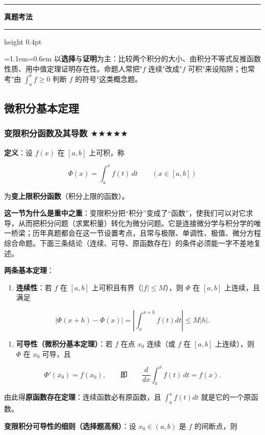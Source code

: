 \documentclass[11pt,openany,UTF8]{ctexbook}
\newcommand{\callouthead}[2]{%
  \par\addvspace{7pt}\noindent
  {\color{#1}\rule[-0.15em]{3pt}{1.05em}}\hspace{0.5em}%
  {\bfseries\color{#1}#2}\par\nobreak\vspace{-0.35em}%
  {\color{rulesep}\hrule height 0.4pt}\nobreak\vspace{0.45em}%
  \begingroup\small\setlength{\parindent}{0pt}%
  \leftskip=1.1em\rightskip=0.6em\noindent\ignorespaces}
\newcommand{\calloutend}{\par\endgroup\addvspace{7pt}}
\newenvironment{callexam}[1]{\callouthead{exambar}{#1}}{\calloutend}
\begin{document}
\begin{callexam}{真题考法}
以\textbf{选择}与\textbf{证明}为主：比较两个积分的大小、由积分不等式反推函数性质、用中值定理证明存在性。命题人常把"$f$ 连续"改成"$f$ 可积"来设陷阱；也常考"由 $\int_a^bf\geq0$ 判断 $f$ 的符号"这类概念题。

\end{callexam}

\subsection{微积分基本定理}

\subsubsection{变限积分函数及其导数 $\bigstar$$\bigstar$$\bigstar$$\bigstar$$\bigstar$}

\textbf{定义}：设 $f(x)$ 在 $[a,b]$ 上可积，称

\[\Phi(x)=\int_a^xf(t)\,dt\qquad (x\in[a,b])\]

为\textbf{变上限积分函数}（积分上限的函数）。

\textbf{这一节为什么是重中之重}：变限积分把“积分”变成了“函数”，使我们可以对它求导，从而把积分问题（求累积量）转化为微分问题。它是连接微分学与积分学的唯一桥梁；历年真题都会在这一节设置考点，且常与极限、单调性、极值、微分方程综合命题。下面三条结论（连续、可导、原函数存在）的条件必须能一字不差地复述。

\textbf{两条基本定理}：

\begin{enumerate}
\item \textbf{连续性}：若 $f$ 在 $[a,b]$ 上可积且有界（$\lvert f\rvert\leq M$），则 $\Phi$ 在 $[a,b]$ 上连续，且满足
\end{enumerate}
\[\left\lvert\Phi(x+h)-\Phi(x)\right\rvert=\left\lvert\int_x^{x+h}f(t)dt\right\rvert\leq M\lvert h\rvert.\]

\begin{enumerate}
\item \textbf{可导性（微积分基本定理）}：若 $f$ 在点 $x_0$ 连续（或 $f$ 在 $[a,b]$ 上连续），则 $\Phi$ 在 $x_0$ 可导，且
\end{enumerate}
\[\Phi'(x_0)=f(x_0),\qquad\text{即}\qquad \frac{d}{dx}\int_a^xf(t)\,dt=f(x).\]

由此得\textbf{原函数存在定理}：连续函数必有原函数，且 $\int_a^xf(t)dt$ 就是它的一个原函数。

\textbf{变限积分可导性的细则（选择题高频）}：设 $x_0\in(a,b)$ 是 $f$ 的间断点，则
\end{document}

